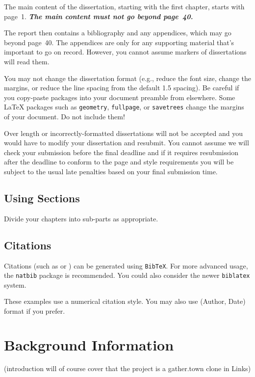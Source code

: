 \documentclass[bsc,frontabs,singlespacing,parskip,deptreport]{infthesis}
\begin{document}
The main content of the dissertation, starting with the first chapter,
starts with page~1. \emph{\textbf{The main content must not go beyond page~40.}}

The report then contains a bibliography and any appendices, which may go beyond
page~40. The appendices are only for any supporting material that's important to
go on record. However, you cannot assume markers of dissertations will read them.

You may not change the dissertation format (e.g., reduce the font size, change
the margins, or reduce the line spacing from the default 1.5 spacing). Be
careful if you copy-paste packages into your document preamble from elsewhere.
Some \LaTeX{} packages such as \texttt{geometry}, \texttt{fullpage}, or
\texttt{savetrees} change the margins of your document. Do not include them!

Over length or incorrectly-formatted dissertations will not be accepted and you
would have to modify your dissertation and resubmit. You cannot assume we will
check your submission before the final deadline and if it requires resubmission
after the deadline to conform to the page and style requirements you will be
subject to the usual late penalties based on your final submission time.

\section{Using Sections}

Divide your chapters into sub-parts as appropriate.

\section{Citations}

Citations (such as \cite{P1} or \cite{P2}) can be generated using
\texttt{BibTeX}. For more advanced usage, the \texttt{natbib} package is
recommended. You could also consider the newer \texttt{biblatex} system.

These examples use a numerical citation style. You may also use
(Author, Date) format if you prefer.

\chapter{Background Information}

(introduction will of course cover that the project is a gather.town clone in Links) \cite{test}
\end{document}
